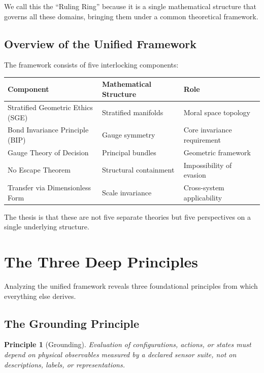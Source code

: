 \documentclass[12pt]{article}
\newtheorem{principle}{Principle}
\begin{document}
We call this the ``Ruling Ring'' because it is a single mathematical structure that governs all these domains, bringing them under a common theoretical framework.

\subsection{Overview of the Unified Framework}

The framework consists of five interlocking components:

\begin{table}[h]
\centering
\begin{tabular}{lll}
\toprule
\textbf{Component} & \textbf{Mathematical Structure} & \textbf{Role} \\
\midrule
Stratified Geometric Ethics (SGE) & Stratified manifolds & Moral space topology \\
Bond Invariance Principle (BIP) & Gauge symmetry & Core invariance requirement \\
Gauge Theory of Decision & Principal bundles & Geometric framework \\
No Escape Theorem & Structural containment & Impossibility of evasion \\
Transfer via Dimensionless Form & Scale invariance & Cross-system applicability \\
\bottomrule
\end{tabular}
\end{table}

The thesis is that these are not five separate theories but five perspectives on a single underlying structure.

\section{The Three Deep Principles}

Analyzing the unified framework reveals three foundational principles from which everything else derives.

\subsection{The Grounding Principle}

\begin{principle}[Grounding]
\textit{Evaluation of configurations, actions, or states must depend on physical observables measured by a declared sensor suite, not on descriptions, labels, or representations.}
\end{principle}
\end{document}
